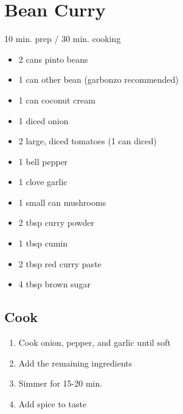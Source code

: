 \documentclass{article}
\begin{document}
\section{Bean Curry}

10 min. prep / 30 min. cooking

\begin{itemize}
\item 2 cans pinto beans
\item 1 can other bean (garbonzo recommended)
\item 1 can coconut cream
\item 1 diced onion
\item 2 large, diced tomatoes (1 can diced)
\item 1 bell pepper
\item 1 clove garlic
\item 1 small can mushrooms
\item 2 tbsp curry powder
\item 1 tbsp cumin
\item 2 tbsp red curry paste
\item 4 tbsp brown sugar
\end{itemize}

\subsection{Cook}

\begin{enumerate}
\item Cook onion, pepper, and garlic until soft
\item Add the remaining ingredients
\item Simmer for 15-20 min.
\item Add spice to taste
\end{enumerate}
\end{document}
